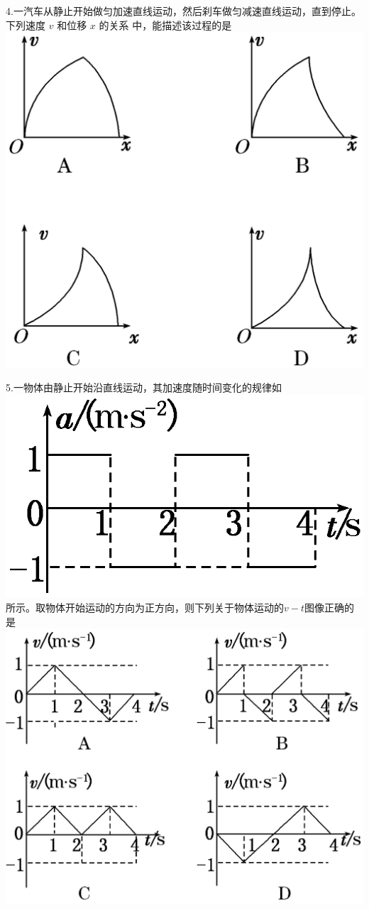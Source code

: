 \documentclass[a4paper,fontset = windows]{ctexbook} %
\begin{document}
\begin{xuanze}
   4.一汽车从静止开始做匀加速直线运动，然后刹车做匀减速直线运动，直到停止。下列速度 $v$ 和位移 $x$ 的关系
   中，能描述该过程的是
   \choice[P] \includegraphics{../picture/1-3/004.png} 

   5.一物体由静止开始沿直线运动，其加速度随时间变化的规律如
   \includegraphics{../picture/1-3/005.png} 
   所示。取物体开始运动的方向为正方向，则下列关于物体运动的$v-t$图像正确的是
   \choice[P] \includegraphics{../picture/1-3/006.png} 


\end{xuanze}
\end{document}
